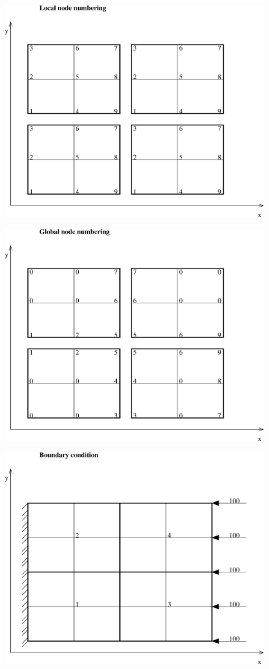 \documentclass[12pt]{book}
\begin{document}
\begin{figure}
\includegraphics[width=120mm]{pgquadlnn.eps}
\end{figure}
\begin{figure}
\includegraphics[width=120mm]{pgquadgnn.eps}
\end{figure}
\begin{figure}
\includegraphics[width=120mm]{pgquadbc.eps}
\end{figure}
\\
\end{document}
